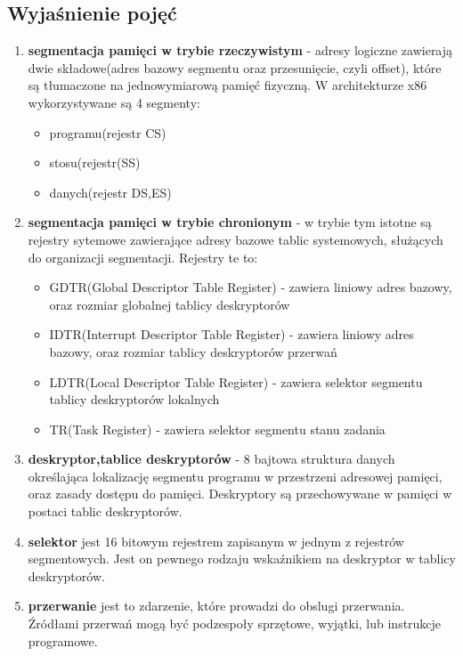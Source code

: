 \documentclass[a4paper,12pt]{article}
\begin{document}
	\subsection{Wyjaśnienie pojęć}
		\begin{enumerate}
				\item{\textbf{segmentacja pamięci w trybie rzeczywistym} - adresy logiczne zawierają dwie składowe(adres bazowy segmentu oraz przesunięcie, czyli offset), które są tłumaczone na jednowymiarową pamięć fizyczną. W architekturze x86 wykorzystywane są 4 segmenty:}
					\begin{itemize}
					\item{programu(rejestr CS)}
					\item{stosu(rejestr(SS)}
					\item{danych(rejestr DS,ES)}
					\end{itemize}
				\item{\textbf{segmentacja pamięci w trybie chronionym} - w trybie tym istotne są rejestry sytemowe zawierające adresy bazowe tablic systemowych, służących do organizacji segmentacji. Rejestry te to:}
					\begin{itemize}
						\item{GDTR(Global Descriptor Table Register) - zawiera liniowy adres bazowy, oraz rozmiar globalnej tablicy deskryptorów}
						\item{IDTR(Interrupt Descriptor Table Register) - zawiera liniowy adres bazowy, oraz rozmiar tablicy deskryptorów przerwań}
						\item{LDTR(Local Descriptor Table Register) - zawiera selektor segmentu tablicy deskryptorów lokalnych}
						\item{TR(Task Register) - zawiera selektor segmentu stanu zadania}
					\end{itemize}
				\item {\textbf{deskryptor,tablice deskryptorów }- 8 bajtowa struktura danych określająca lokalizację segmentu programu w przestrzeni adresowej pamięci, oraz zasady dostępu do pamięci. Deskryptory są przechowywane w pamięci w postaci tablic deskryptorów.}
				\item{\textbf{selektor} jest 16 bitowym rejestrem zapisanym w jednym z rejestrów segmentowych. Jest on pewnego rodzaju wskaźnikiem na deskryptor w tablicy deskryptorów.}
					
				\item{\textbf{przerwanie} jest to zdarzenie, które prowadzi do obslugi przerwania. Źródłami przerwań mogą być podzespoły sprzętowe, wyjątki, lub instrukcje programowe. }
			\end{enumerate}
	
\end{document}
